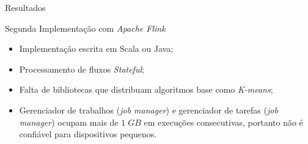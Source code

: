 \documentclass[aspectratio=1610,10pt]{beamer}
\newcommand{\nota}[1]{\hspace*{-0.5cm}\textit{{\color[rgb]{1,0,0}Nota: #1}}}
\begin{document}
\begin{frame}[fragile]{Resultados}
  \begin{alertblock}{Segunda Implementação com \emph{Apache Flink}}
    \begin{itemize}%
      \item Implementação escrita em Scala ou Java;
      \item Processamento de fluxos \emph{Stateful};
      \item Falta de bibliotecas que distribuam algoritmos base como \emph{K-means};
      \item Gerenciador de trabalhos (\emph{job manager}) e gerenciador de
      tarefas (\emph{job manager}) ocupam mais de $1\;GB$ em execuções
      consecutivas, portanto não é confiável para dispositivos pequenos.
    \end{itemize}
  \end{alertblock}


\end{frame}
\end{document}
